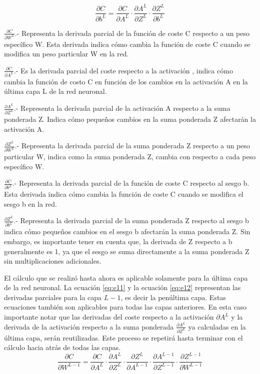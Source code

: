 \begin{itemize}
\begin{equation} \label{eq:e10} 
	\frac{\partial C}{\partial b^L}=\frac{\partial C}{\partial A^L}\cdot \frac{\partial A^L }{\partial Z^L}\cdot \frac{\partial Z^L }{\partial b^L}
\end{equation}

$\frac{\partial C}{\partial W^L} $.- Representa la derivada parcial de la función de coste C respecto a un peso específico W. Esta derivada indica cómo cambia la función de coste C cuando se modifica un peso particular W en la red.

$\frac{\partial C}{\partial A^L} $.- Es la derivada parcial del coste  respecto a la activación , indica cómo cambia la función de costo C en función de los cambios en la activación A en la última capa L de la red neuronal.

$\frac{\partial A^L }{\partial Z^L} $.- Representa la derivada parcial de la activación A respecto a la suma ponderada Z. Indica cómo pequeños cambios en la suma ponderada Z afectarán la activación A.

$\frac{\partial Z^L }{\partial W^L} $.- Representa la derivada parcial de la suma ponderada Z respecto a un peso particular W, indica como la suma ponderada Z, cambia con respecto a cada peso específico W.

$\frac{\partial C}{\partial b^L} $.- Representa la derivada parcial de la función de coste C respecto al sesgo b. Esta derivada indica cómo cambia la función de coste C cuando se modifica el sesgo b en la red.

$\frac{\partial Z^L }{\partial b^L} $.- Representa la derivada parcial de la suma ponderada Z respecto al sesgo b indica cómo pequeños cambios en el sesgo b afectarán la suma ponderada Z. Sin embargo, es importante tener en cuenta que, la derivada de Z respecto a b generalmente es 1, ya que el sesgo se suma directamente a la suma ponderada Z sin multiplicaciones adicionales.

El cálculo que se realizó hasta ahora es aplicable solamente para la última capa de la red neuronal. La ecuación \ref{eq:e11} y la ecuación \ref{eq:e12} representan las derivadas parciales para la capa $L-1$, es decir la penúltima capa. Estas ecuaciones también son aplicables para todas las capas anteriores. En esta caso  importante notar que las derivadas del coste respecto a la activación $\partial  A^L$  y la derivada de la activación respecto a la suma ponderada  $\frac{\partial  A^L}{\partial  Z^L}$ ya calculadas en la última capa, serán reutilizadas.  Este proceso se repetirá hasta terminar con el cálculo hacia atrás de todas las capas.
\begin{equation} \label{eq:e11} 
	\frac{\partial C}{\partial W^{L-1}}=\frac{\partial C}{\partial A^L}\cdot \frac{\partial A^L }{\partial Z^L}\cdot \frac{\partial Z^L }{\partial A^{L-1}}\cdot \frac{\partial A^{L-1} }{\partial Z^{L-1}}\cdot \frac{\partial Z^{L-1}}{\partial W^{L-1}}
\end{equation}


\end{itemize}
